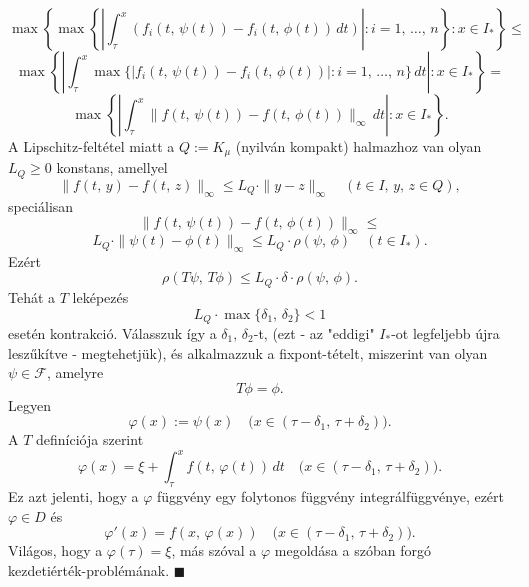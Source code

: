 \documentclass[12pt]{article}
\begin{document}
    \[
        \max \left\{  \max \left\{  \left| \int_\tau^x (f_i(t, \, \psi(t)) - f_i(t, \, \phi(t)) \, dt) \right| : i = 1, \, \dots, \, n \right\} : x \in I_* \right\} \leq
    \]
    \[
        \max \left\{  \left| \int_\tau^x \max \{ |f_i(t, \, \psi(t)) - f_i(t, \, \phi(t))| : i = 1, \, \dots, \, n \} \, dt \right| : x \in I_* \right\} =
    \]
    \[
        \max \left\{ \left| \int_\tau^x \| f(t, \, \psi(t)) - f(t, \, \phi(t))\|_\infty \, dt \right| : x \in I_* \right\}.
    \]
    A Lipschitz-feltétel miatt a $Q := K_\mu$ (nyilván kompakt) halmazhoz van olyan $L_Q \geq 0$ konstans, amellyel
    \[
        \| f(t, \, y) - f(t, \, z)\|_\infty \leq L_Q \cdot \| y-z \|_\infty \quad (t \in I, \, y, \, z \in Q),
    \]
    speciálisan
    \[
        \| f(t, \, \psi(t)) - f(t, \, \phi(t))\|_\infty \leq
    \]
    \[
        L_Q \cdot \| \psi(t) - \phi(t) \|_\infty \leq L_Q \cdot \rho(\psi, \, \phi) \quad (t \in I_*).
    \]
    Ezért
    \[
        \rho(T\psi, \, T\phi) \leq L_Q \cdot \delta \cdot \rho(\psi, \, \phi).
    \]
    Tehát a $T$ leképezés
    \[
        L_Q \cdot \max \{\delta_1, \, \delta_2\} < 1
    \]
    esetén kontrakció. Válasszuk így a $\delta_1, \, \delta_2$-t, (ezt - az "eddigi" $I_*$-ot legfeljebb újra leszűkítve - megtehetjük), és alkalmazzuk a fixpont-tételt, miszerint van olyan $\psi \in \mathcal{F}$, amelyre
    \[
        T\phi = \phi.
    \]
    Legyen
    \[
        \varphi(x) := \psi(x) \quad \big( x \in (\tau - \delta_1, \, \tau + \delta_2) \big).
    \]
    A $T$ definíciója szerint
    \[
        \varphi(x) = \xi + \int_\tau^x f(t, \, \varphi(t)) \, dt \quad \big( x \in (\tau - \delta_1, \, \tau + \delta_2) \big).
    \]
    Ez azt jelenti, hogy a $\varphi$ függvény egy folytonos függvény integrálfüggvénye, ezért $\varphi \in D$ és
    \[
        \varphi'(x) = f(x, \, \varphi(x)) \quad \big( x \in (\tau - \delta_1, \, \tau + \delta_2) \big).
    \]
    Világos, hogy a $\varphi(\tau) = \xi$, más szóval a $\varphi$ megoldása a szóban forgó kezdetiérték-problémának. $\blacksquare$
    
    
\end{document}
